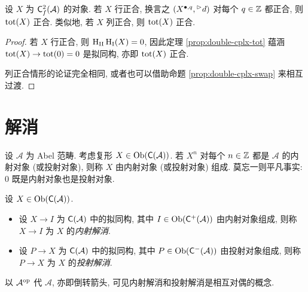 \begin{corollary}\label{prop:acyclic-assembly}
	设 $X$ 为 $\mathsf{C}_f^2(\mathcal{A})$ 的对象. 若 $X$ 行正合, 换言之 $\left( X^{\bullet, q}, {}^\vartriangleright d \right)$ 对每个 $q \in \mathbb{Z}$ 都正合, 则 $\operatorname{tot}(X)$ 正合. 类似地, 若 $X$ 列正合, 则 $\operatorname{tot}(X)$ 正合.
\end{corollary}
\begin{proof}
	若 $X$ 行正合, 则 $\operatorname{H}_{\mathrm{II}} \operatorname{H}_{\mathrm{I}}(X) = 0$, 因此定理 \ref{prop:double-cplx-tot} 蕴涵 $\operatorname{tot}(X) \to \operatorname{tot}(0) = 0$ 是拟同构, 亦即 $\operatorname{tot}(X)$ 正合.

	列正合情形的论证完全相同, 或者也可以借助命题 \ref{prop:double-cplx-swap} 来相互过渡.
\end{proof}

\section{解消}\label{sec:resolutions}
设 $\mathcal{A}$ 为 Abel 范畴. 考虑复形 $X \in \operatorname{Ob}(\mathsf{C}(\mathcal{A}))$. 若 $X^n$ 对每个 $n \in \mathbb{Z}$ 都是 $\mathcal{A}$ 的内射对象 (或投射对象), 则称 $X$ 由内射对象 (或投射对象) 组成. 莫忘一则平凡事实: $0$ 既是内射对象也是投射对象.

\begin{definition}\label{def:resolutions}
	设 $X \in \operatorname{Ob}(\mathsf{C}(\mathcal{A}))$.
	\begin{itemize}
		\item 设 $X \to I$ 为 $\mathsf{C}(\mathcal{A})$ 中的拟同构, 其中 $I \in \operatorname{Ob}(\mathsf{C}^+(\mathcal{A}))$ 由内射对象组成, 则称 $X \to I$ 为 $X$ 的\emph{内射解消}.
		\item 设 $P \to X$ 为 $\mathsf{C}(\mathcal{A})$ 中的拟同构, 其中 $P \in \operatorname{Ob}(\mathsf{C}^-(\mathcal{A}))$ 由投射对象组成, 则称 $P \to X$ 为 $X$ 的\emph{投射解消}.
	\end{itemize}
\end{definition}

以 $\mathcal{A}^{\operatorname{op}}$ 代 $\mathcal{A}$, 亦即倒转箭头, 可见内射解消和投射解消是相互对偶的概念.

